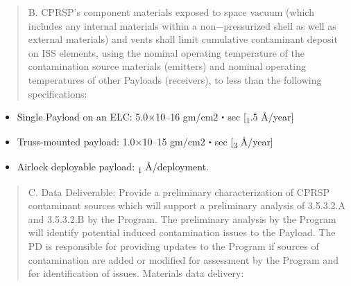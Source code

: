 \begin{quote}
B. CPRSP's component materials exposed to space vacuum (which includes any internal materials within a non−pressurized shell as well as external materials) and vents shall limit cumulative contaminant deposit on ISS elements, using the nominal operating temperature of the contamination source materials (emitters) and nominal operating temperatures of other Payloads (receivers), to less than the following specifications:
\end{quote}

\begin{itemize}
\item{} Single Payload on an ELC: 5.0×10--16 gm\slash cm2・sec [\textsubscript{1}.5 Å\slash year]

\item{} Truss-mounted payload: 1.0×10--15 gm\slash cm2・sec [\textsubscript{3} Å\slash year]

\item{} Airlock deployable payload: \textsubscript{1} Å\slash deployment.

\end{itemize}

\begin{quote}
C. Data Deliverable: Provide a preliminary characterization of CPRSP contaminant sources which will support a preliminary analysis of 3.5.3.2.A and 3.5.3.2.B by the Program. The preliminary analysis by the Program will identify potential induced contamination issues to the Payload. The PD is responsible for providing updates to the Program if sources of contamination are added or modified for assessment by the Program and for identification of issues.
Materials data delivery:
\end{quote}

